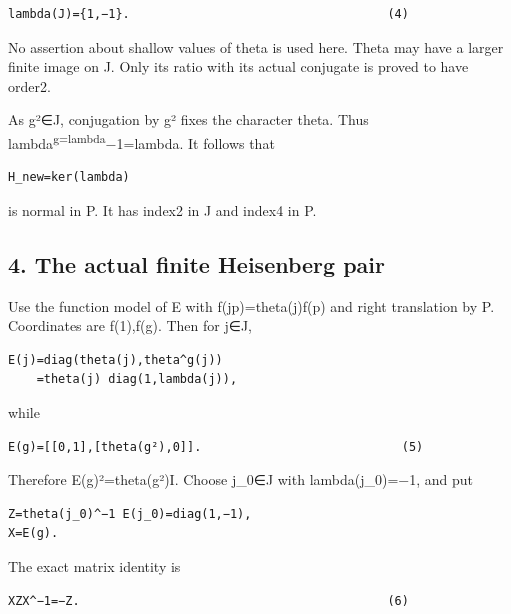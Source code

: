 \begin{Verbatim}[fontsize=\small,breaklines=true,breakanywhere=true]
lambda(J)={1,−1}.                                    (4)
\end{Verbatim}

No assertion about shallow values of theta is used here. Theta may have
a larger finite image on J. Only its ratio with its actual conjugate is
proved to have order2.

As g²∈J, conjugation by g² fixes the character theta. Thus
lambda\textsuperscript{g=lambda}−1=lambda. It follows that

\begin{Verbatim}[fontsize=\small,breaklines=true,breakanywhere=true]
H_new=ker(lambda)
\end{Verbatim}

is normal in P. It has index2 in J and index4 in P.

\hypertarget{rank2-the-actual-finite-heisenberg-pair}{%
\subsection{4. The actual finite Heisenberg
pair}\label{rank2-the-actual-finite-heisenberg-pair}}

Use the function model of E with f(jp)=theta(j)f(p) and right
translation by P. Coordinates are f(1),f(g). Then for j∈J,

\begin{Verbatim}[fontsize=\small,breaklines=true,breakanywhere=true]
E(j)=diag(theta(j),theta^g(j))
    =theta(j) diag(1,lambda(j)),
\end{Verbatim}

while

\begin{Verbatim}[fontsize=\small,breaklines=true,breakanywhere=true]
E(g)=[[0,1],[theta(g²),0]].                            (5)
\end{Verbatim}

Therefore E(g)²=theta(g²)I. Choose j\_0∈J with lambda(j\_0)=−1, and put

\begin{Verbatim}[fontsize=\small,breaklines=true,breakanywhere=true]
Z=theta(j_0)^−1 E(j_0)=diag(1,−1),
X=E(g).
\end{Verbatim}

The exact matrix identity is

\begin{Verbatim}[fontsize=\small,breaklines=true,breakanywhere=true]
XZX^−1=−Z.                                           (6)
\end{Verbatim}

